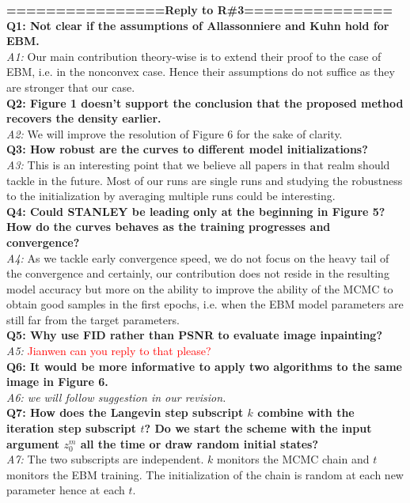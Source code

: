 \documentclass{article}
\begin{document}
\textbf{================Reply to R\#3===============}\\
\textbf{Q1: Not clear if the assumptions of Allassonniere and Kuhn hold for EBM.}\\
\textit{A1: }Our main contribution theory-wise is to extend their proof to the case of EBM, i.e. in the nonconvex case. Hence their assumptions do not suffice as they are stronger that our case.\\

\textbf{Q2: Figure 1 doesn't support the conclusion that the proposed method recovers the density earlier. }\\
\textit{A2: } We will improve the resolution of Figure 6 for the sake of clarity.\\

\textbf{Q3: How robust are the curves to different model initializations?}\\
\textit{A3:} This is an interesting point that we believe all papers in that realm should tackle in the future. Most of our runs are single runs and studying the robustness to the initialization by averaging multiple runs could be interesting. \\

\textbf{Q4: Could STANLEY be leading only at the beginning in Figure 5? How do the curves behaves as the training progresses and convergence?}\\
\textit{A4:} As we tackle early convergence speed, we do not focus on the heavy tail of the convergence and certainly, our contribution does not reside in the resulting model accuracy but more on the ability to improve the ability of the MCMC to obtain good samples in the first epochs, i.e. when the EBM model parameters are still far from the target parameters.\\

\textbf{Q5: Why use FID rather than PSNR to evaluate image inpainting?}\\
\textit{A5:} \textcolor{red}{Jianwen can you reply to that please?} \\

\textbf{Q6: It would be more informative to apply two algorithms to the same image in Figure 6.}\\
\textit{A6: we will follow suggestion in our revision.}\\

\textbf{Q7: How does the Langevin step subscript $k$ combine with the iteration step subscript $t$? Do we start the scheme with the input argument $z_0^m$ all the time or draw random initial states?}\\
\textit{A7:} The two subscripts are independent. $k$ monitors the MCMC chain and $t$ monitors the EBM training. The initialization of the chain is random at each new parameter hence at each $t$.\\
\end{document}
